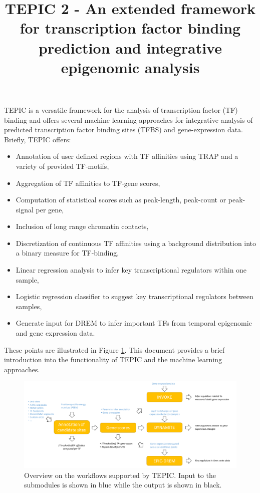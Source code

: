 \documentclass{article}
\date{}
\begin{document}
\title{TEPIC 2 - An extended framework for transcription factor binding prediction and integrative epigenomic analysis}
\maketitle

TEPIC is a versatile framework for the analysis of transcription factor (TF) binding and offers several machine learning approaches for integrative analysis of predicted transcription factor binding sites (TFBS) and gene-expression data.
Briefly, TEPIC offers:
\begin{itemize}
\item Annotation of user defined regions with TF affinities using TRAP and a variety of provided TF-motifs,
\item Aggregation of TF affinities to TF-gene scores,
\item Computation of statistical scores such as peak-length, peak-count or peak-signal per gene,
\item Inclusion of long range chromatin contacts,
\item Discretization of continuous TF affinities using a background distribution into a binary measure for TF-binding,
\item Linear regression analysis to infer key transcriptional regulators within one sample,
\item Logistic regression classifier to suggest key transcriptional regulators between samples,
\item Generate input for DREM to infer important TFs from temporal epigenomic and gene expression data.
\end{itemize}

These points are illustrated in Figure \ref{FigOverview}.
This document provides a brief introduction into the functionality of TEPIC and the machine learning approaches. 
\begin{figure}[h]
\includegraphics[width=\textwidth]{workflow_TEPIC_General.pdf}
\caption{Overview on the workflows supported by TEPIC. Input to the submodules is shown in blue while the output is shown in black.}
\label{FigOverview}
\end{figure}
\newpage
\end{document}
